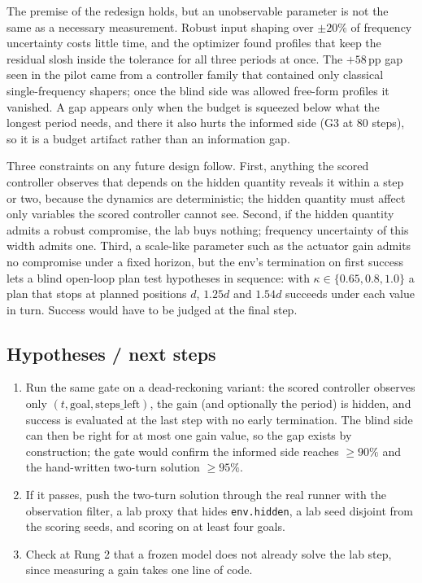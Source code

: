 \documentclass[11pt,a4paper]{article}
\begin{document}
The premise of the redesign holds, but an unobservable parameter is not the
same as a necessary measurement. Robust input shaping over $\pm20\%$ of
frequency uncertainty costs little time, and the optimizer found profiles
that keep the residual slosh inside the tolerance for all three periods at
once. The $+58$\,pp gap seen in the pilot came from a controller family that
contained only classical single-frequency shapers; once the blind side was
allowed free-form profiles it vanished. A gap appears only when the budget is
squeezed below what the longest period needs, and there it also hurts the
informed side (G3 at 80 steps), so it is a budget artifact rather than an
information gap.

Three constraints on any future design follow. First, anything the scored
controller observes that depends on the hidden quantity reveals it within a
step or two, because the dynamics are deterministic; the hidden quantity must
affect only variables the scored controller cannot see. Second, if the hidden
quantity admits a robust compromise, the lab buys nothing; frequency
uncertainty of this width admits one. Third, a scale-like parameter such as
the actuator gain admits no compromise under a fixed horizon, but the env's
termination on first success lets a blind open-loop plan test hypotheses in
sequence: with $\kappa\in\{0.65,0.8,1.0\}$ a plan that stops at planned
positions $d$, $1.25d$ and $1.54d$ succeeds under each value in turn. Success
would have to be judged at the final step.

\subsection*{Hypotheses / next steps}

\begin{enumerate}[nosep]
\item Run the same gate on a dead-reckoning variant: the scored controller
  observes only $(t, \text{goal}, \text{steps\_left})$, the gain (and
  optionally the period) is hidden, and success is evaluated at the last step
  with no early termination. The blind side can then be right for at most one
  gain value, so the gap exists by construction; the gate would confirm the
  informed side reaches $\geq 90\%$ and the hand-written two-turn solution
  $\geq 95\%$.
\item If it passes, push the two-turn solution through the real runner with
  the observation filter, a lab proxy that hides \texttt{env.hidden}, a lab
  seed disjoint from the scoring seeds, and scoring on at least four goals.
\item Check at Rung 2 that a frozen model does not already solve the lab
  step, since measuring a gain takes one line of code.
\end{enumerate}
\end{document}
